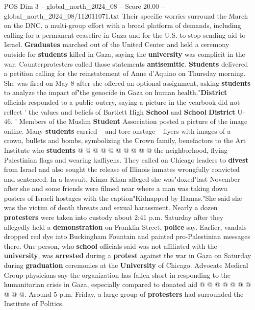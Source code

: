 \begin{textsample}{POS Dim 3 – global\_north\_2024\_08 – Score 20.00 – global\_north\_2024\_08/112011071.txt}  \label{ex:f3_pos_142}
Their specific worries surround the March on the DNC, a multi-group effort with a broad platform of demands, including calling for a permanent ceasefire in Gaza and for the U.S. to stop sending aid to Israel. \textbf{Graduates} marched out of the United Center and held a ceremony outside for \textbf{students} killed in Gaza, saying the \textbf{university} was complicit in the war.
Counterprotesters called those statements \textbf{antisemitic}. \textbf{Students} delivered a petition calling for the reinstatement of Anne d'Aquino on Thursday morning.
She was fired on May 8 after she offered an optional assignment, asking \textbf{students} to analyze the impact of"the genocide in Gaza on human health."\textbf{District} officials responded to a public outcry, saying a picture in the yearbook did not reflect ' the values and beliefs of Bartlett High \textbf{School} and \textbf{School} \textbf{District} U-46. ' Members of the Muslim \textbf{Student} Association posted a picture of the image online.
Many \textbf{students} carried -- and tore onstage -- flyers with images of a crown, bullets and bombs, symbolizing the Crown family, benefactors to the Art Institute who \textbf{students} @ @ @ @ @ @ @ @ @ @ the neighborhood, flying Palestinian flags and wearing kaffiyehs.
They called on Chicago leaders to \textbf{divest} from Israel and also sought the release of Illinois inmates wrongfully convicted and sentenced.
In a lawsuit, Kinza Khan alleged she was"doxed"last November after she and some friends were filmed near where a man was taking down posters of Israeli hostages with the caption"Kidnapped by Hamas."She said she was the victim of death threats and sexual harassment.
Nearly a dozen \textbf{protesters} were taken into custody about 2:41 p.m.
Saturday after they allegedly held a \textbf{demonstration} on Franklin Street, \textbf{police} say.
Earlier, vandals dropped red dye into Buckingham Fountain and painted pro-Palestinian messages there.
One person, who \textbf{school} officials said was not affiliated with the \textbf{university}, was \textbf{arrested} during a \textbf{protest} against the war in Gaza on Saturday during \textbf{graduation} ceremonies at the \textbf{University} of Chicago.
Advocate Medical Group physicians say the organization has fallen short in responding to the humanitarian crisis in Gaza, especially compared to donated aid @ @ @ @ @ @ @ @ @ @.
Around 5 p.m.
Friday, a large group of \textbf{protesters} had surrounded the Institute of Politics.

\end{textsample}
